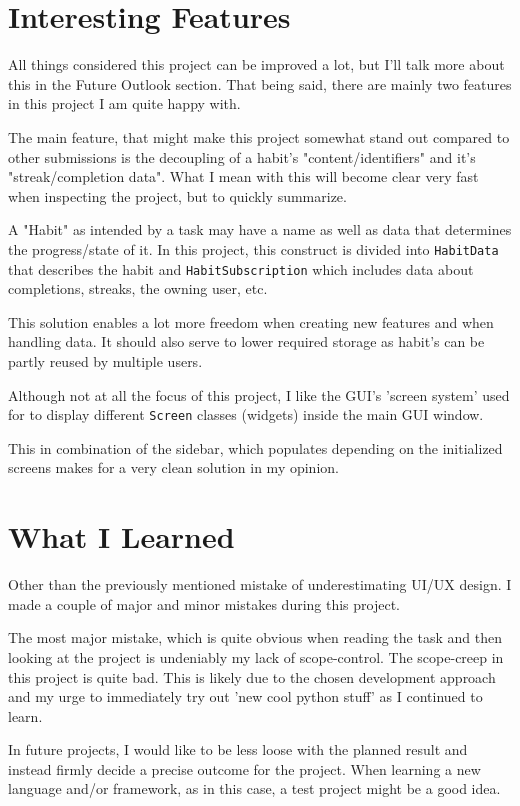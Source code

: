\documentclass[11pt]{article}
\begin{document}
\section*{Interesting Features}

All things considered this project can be improved a lot, but I'll talk more
about this in the Future Outlook section. That being said, there are mainly two features in this project I am quite
happy with.

The main feature, that might make this project somewhat stand out compared to other
submissions is the decoupling of a habit's "content/identifiers" and it's "streak/completion data".
What I mean with this will become clear very fast when inspecting the project, but
to quickly summarize.

A "Habit" as intended by a task may have a name as well as data
that determines the progress/state of it. In this project, this construct is divided
into \texttt{HabitData} that describes the habit and \texttt{HabitSubscription}
which includes data about completions, streaks, the owning user, etc.

This solution enables a lot more freedom when creating new features and when handling
data. It should also serve to lower required storage as habit's can be partly reused
by multiple users.

Although not at all the focus of this project, I like the GUI's 'screen system'
used for to display different \texttt{Screen} classes (widgets) inside the main
GUI window.

This in combination of the sidebar, which populates depending on the initialized
screens makes for a very clean solution in my opinion.

\section*{What I Learned}

Other than the previously mentioned mistake of underestimating UI/UX design.
I made a couple of major and minor mistakes during this project.

The most major mistake, which is quite obvious when reading the task and then
looking at the project is undeniably my lack of scope-control. The scope-creep
in this project is quite bad. This is likely due to the chosen development
approach and my urge to immediately try out 'new cool python stuff' as I
continued to learn.

In future projects, I would like to be less loose with the planned result and
instead firmly decide a precise outcome for the project. When learning a new
language and/or framework, as in this case, a test project might be a good idea.
\end{document}
